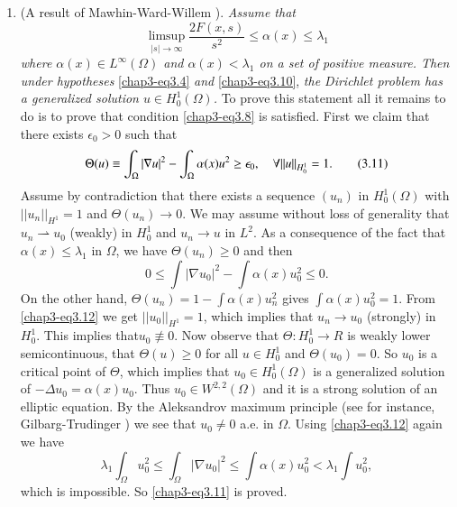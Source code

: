 \begin{remarks*}
\begin{enumerate}
\item (A result of Mawhin-Ward-Willem \cite{key60}). {\em Assume that}
\begin{equation*}
\mathop{\lim\sup}\limits_{|s|\to\infty}\frac{2F(x,s)}{s^{2}}\leq
\alpha (x)\leq \lambda_{1}\tag{3.10}\label{chap3-eq3.10}
\end{equation*}
{\em where $\alpha(x)\in L^{\infty}(\Omega)$ and $\alpha(x)<\lambda_{1}$ on
a set of positive measure. Then under hypotheses} \eqref{chap3-eq3.4}
{\em and} \eqref{chap3-eq3.10}, {\em the Dirichlet problem has a
  generalized solution $u\in H^{1}_{0}(\Omega)$.} To prove this
statement all it remains to do is to prove that condition
\eqref{chap3-eq3.8} is satisfied. First we claim that there exists
$\epsilon_{0}>0$ such that
\begin{equation*}
\Theta(u)\equiv \int_{\Omega}|\nabla
u|^{2}-\int_{\Omega}\alpha(x)u^{2}\geq \epsilon_{0},\quad \forall
||u||_{H^{1}_{0}}=1.\tag{3.11}\label{chap3-eq3.11} 
\end{equation*}
Assume by contradiction that there exists a sequence $(u_{n})$
in\break 
$H^{1}_{0}(\Omega)$ with $||u_{n}||_{H^{1}}=1$ and $\Theta(u_{n})\to
0$. We may assume without loss of generality that
$u_{n}\rightharpoonup u_{0}$ (weakly) in $H^{1}_{0}$ and $u_{n}\to u$
in $L^{2}$. As a consequence of the fact that $\alpha(x)\leq
\lambda_{1}$ in $\Omega$, we have $\Theta(u_{n})\geq 0$ and then 
\begin{equation*}
0\leq \int |\nabla u_{0}|^{2}-\int\alpha(x)u^{2}_{0}\leq
0.\tag{3.12}\label{chap3-eq3.12} 
\end{equation*}
On the other hand, $\Theta(u_{n})=1-\int\alpha(x)u^{2}_{n}$ gives
$\int \alpha (x)u^{2}_{0}=1$. From \eqref{chap3-eq3.12} we get
$||u_{0}||_{H^{1}}=1$, which implies that $u_{n}\to u_{0}$ (strongly)
in $H^{1}_{0}$. This implies that\pageoriginale $u_{0}\nequiv 0$. Now
observe that $\Theta:H^{1}_{0}\to R$ is weakly lower semicontinuous,
that $\Theta(u)\geq 0$ for all $u\in H^{1}_{0}$ and
$\Theta(u_{0})=0$. So $u_{0}$ is a critical point of $\Theta$, which
implies that $u_{0}\in H^{1}_{0}(\Omega)$ is a generalized solution of
$-\Delta u_{0}=\alpha(x)u_{0}$. Thus $u_{0}\in W^{2,2}(\Omega)$ and it
is a strong solution of an elliptic equation. By the Aleksandrov
maximum principle (see for instance, Gilbarg-Trudinger
\cite[p. 246]{key46}) we see that $u_{0}\neq 0$ a.e. in
$\Omega$. Using \eqref{chap3-eq3.12} again we have
$$
\lambda_{1}\int_{\Omega}u^{2}_{0}\leq \int_{\Omega}|\nabla
u_{0}|^{2}\leq \int \alpha (x)u^{2}_{0}<\lambda_{1}\int u^{2}_{0},
$$
which is impossible. So \eqref{chap3-eq3.11} is proved.


\end{enumerate}
\end{remarks*}
